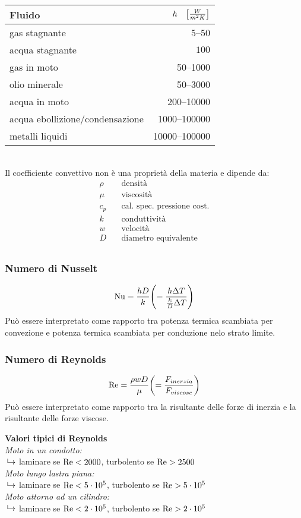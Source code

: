 \begin{tabular}{p{5cm}r}
    \toprule
    Fluido & $h \quad \qty[\frac{W}{m^2K}]$ \\ \midrule
    gas stagnante &  \numrange{5}{50} \\
    acqua stagnante & $100$ \\
    gas in moto & \numrange{50}{1000} \\
    olio minerale & \numrange{50}{3000} \\
    acqua in moto & \numrange{200}{10000} \\
    acqua ebollizione/condensazione & \numrange{1000}{100000} \\
    metalli liquidi & \numrange{10000}{100000} \\
    \bottomrule
\end{tabular}\\

Il coefficiente convettivo non è una proprietà della materia e dipende da:
\begin{align*}
    \rho & \quad \text{densità} \\
    \mu & \quad \text{viscosità} \\
    c_p & \quad \text{cal. spec. pressione cost.} \\
    k & \quad \text{conduttività} \\
    w & \quad \text{velocità} \\
    D & \quad \text{diametro equivalente} \\
\end{align*}


\subsubsection{Numero di Nusselt}
\[ \operatorname{Nu} = \frac{h D}{k} \qty( = \frac{h \Delta T}{\frac{k}{D} \Delta T})\] 
Può essere interpretato come rapporto tra potenza termica scambiata per convezione e potenza termica scambiata per conduzione nelo strato limite.

\subsubsection{Numero di Reynolds}
\[ \operatorname{Re} = \frac{\rho w D}{\mu} \qty( = \frac{F_{inerzia}}{F_{viscose}})\] 
Può essere interpretato come rapporto tra la risultante delle forze di inerzia e la risultante delle forze viscose.

\textbf{Valori tipici di Reynolds}\\
\textit{Moto in un condotto:}\\
\phantom{→}$\put(3,2){\line(0,1){5}}\to$ laminare se $\operatorname{Re} < 2000$, turbolento se $\operatorname{Re} > 2500$\\
\textit{Moto lungo lastra piana:}\\
\phantom{→}$\put(3,2){\line(0,1){5}}\to$ laminare se $\operatorname{Re} < 5 \cdot 10^5$, turbolento se $\operatorname{Re} > 5 \cdot 10^5$\\
\textit{Moto attorno ad un cilindro:}\\
\phantom{→}$\put(3,2){\line(0,1){5}}\to$ laminare se $\operatorname{Re} < 2 \cdot 10^5$, turbolento se $\operatorname{Re} > 2 \cdot 10^5$\\

